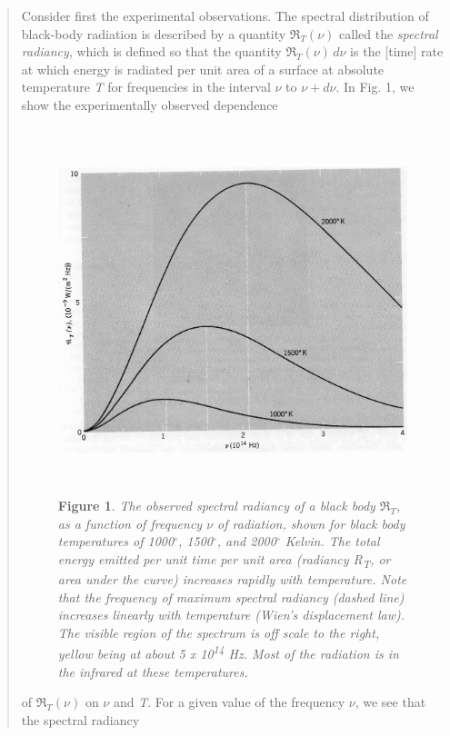 \begin{quotation}
Consider first the experimental observations. The spectral distribution
of black-body radiation is described by a quantity
$\Re_T(\nu)$ called the \emph{spectral radiancy}, which
is defined so that the quantity $\Re_T(\nu)\,d\nu$ is the
{[}time{]} rate at which energy is radiated per unit area of a surface
at absolute temperature \emph{T} for frequencies in the interval
$\nu$ to $\nu\! +\! d\nu$. In Fig. 1, we show the experimentally
observed dependence
%
\begin{figure}[h]
  \begin{center}
  \captionsetup{width=.8\linewidth}
  \includegraphics[width=5.125in,height=4.19792in]{images/05_planck/image001.jpg}
  \caption*{\textbf{Figure 1}. \emph{The observed spectral radiancy of a black body
  $\Re_T$, as a function of frequency $\nu$ of
  radiation, shown for black body temperatures of 1000$^\circ$, 1500$^\circ$, and 2000$^\circ$
  Kelvin. The total energy emitted per unit time per unit area (radiancy
  \emph{R\textsubscript{T}}, or area under the curve) increases rapidly
  with temperature. Note that the frequency of maximum spectral radiancy
  (dashed line) increases linearly with temperature (Wien's displacement
  law). The visible region of the spectrum is off scale to the right,
  yellow being at about 5 x 10\textsuperscript{14} Hz. Most of the
  radiation is in the infrared at these temperatures.}}
  \end{center}
\end{figure}
%
of $\Re_T(\nu)$ on $\nu$ and \emph{T}. For a given
value of the frequency $\nu$, we see that the spectral radiancy

\end{quotation}
